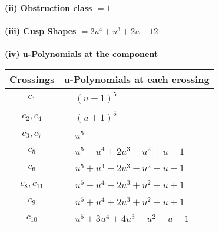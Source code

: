 \documentclass[1p]{elsarticle_modified}
\theoremstyle{definition}
\begin{document}
\flushleft \textbf{(ii) Obstruction class $= 1$}\\~\\
\flushleft \textbf{(iii) Cusp Shapes $= 2 u^4+u^3+2 u-12$}\\~\\
\newpage\renewcommand{\arraystretch}{1}
\flushleft \textbf{(iv) u-Polynomials at the component}\newline \\
\begin{tabular}{m{50pt}|m{274pt}}
Crossings & \hspace{64pt}u-Polynomials at each crossing \\
\hline $$\begin{aligned}c_{1}\end{aligned}$$&$\begin{aligned}
&(u-1)^5
\end{aligned}$\\
\hline $$\begin{aligned}c_{2},c_{4}\end{aligned}$$&$\begin{aligned}
&(u+1)^5
\end{aligned}$\\
\hline $$\begin{aligned}c_{3},c_{7}\end{aligned}$$&$\begin{aligned}
&u^5
\end{aligned}$\\
\hline $$\begin{aligned}c_{5}\end{aligned}$$&$\begin{aligned}
&u^5- u^4+2 u^3- u^2+u-1
\end{aligned}$\\
\hline $$\begin{aligned}c_{6}\end{aligned}$$&$\begin{aligned}
&u^5+u^4-2 u^3- u^2+u-1
\end{aligned}$\\
\hline $$\begin{aligned}c_{8},c_{11}\end{aligned}$$&$\begin{aligned}
&u^5- u^4-2 u^3+u^2+u+1
\end{aligned}$\\
\hline $$\begin{aligned}c_{9}\end{aligned}$$&$\begin{aligned}
&u^5+u^4+2 u^3+u^2+u+1
\end{aligned}$\\
\hline $$\begin{aligned}c_{10}\end{aligned}$$&$\begin{aligned}
&u^5+3 u^4+4 u^3+u^2- u-1
\end{aligned}$\\
\hline
\end{tabular}\\~\\
\end{document}
